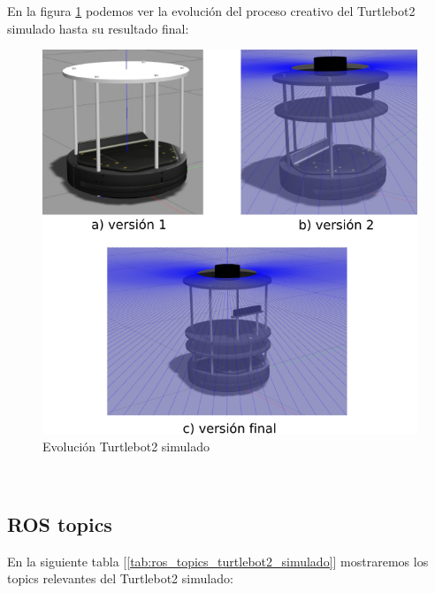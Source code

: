 En la figura \ref{fig:evolucion_turtlebot2_sim} podemos ver la evolución del proceso creativo del Turtlebot2 simulado hasta su resultado final:\\
\begin{figure} [H]
  \begin{center}
    \includegraphics[width=12.5cm]{imagenes/cap4/creacion-turtlebot2-sim.png}
  \end{center}
  \caption[Evolución Turtlebot2 simulado]{Evolución Turtlebot2 simulado}
  \label{fig:evolucion_turtlebot2_sim}
\end{figure}\


\subsection{ROS topics}
\label{subsec:ros_topics}

En la siguiente tabla [\ref{tab:ros_topics_turtlebot2_simulado}] mostraremos los topics relevantes del Turtlebot2 simulado:

